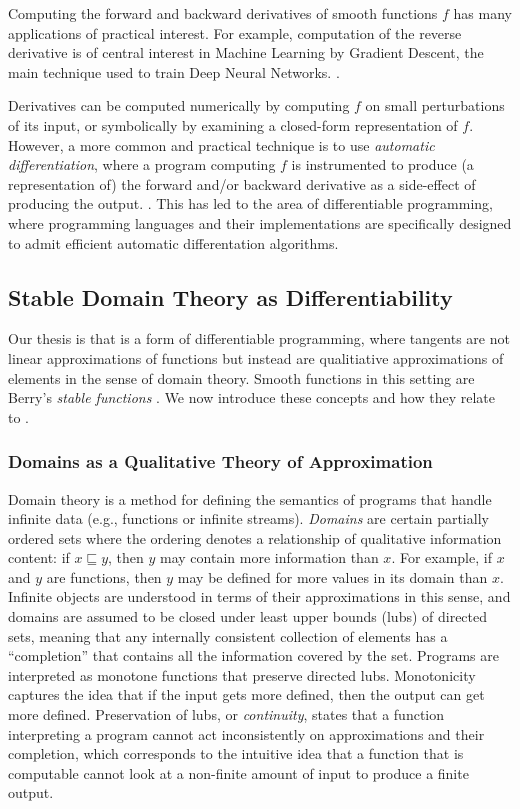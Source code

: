 Computing the forward and backward derivatives of smooth functions $f$ has many applications of practical interest. For example, computation of the reverse derivative is of central interest in Machine Learning by Gradient Descent, the main technique used to train Deep Neural Networks. .

Derivatives can be computed numerically by computing $f$ on small perturbations of its input, or symbolically by examining a closed-form representation of $f$. However, a more common and practical technique is to use \emph{automatic differentiation}, where a program computing $f$ is instrumented to produce (a representation of) the forward and/or backward derivative as a side-effect of producing the output. . This has led to the area of differentiable programming, where programming languages and their implementations are specifically designed to admit efficient automatic differentation algorithms. 

\subsection{Stable Domain Theory as Differentiability}

Our thesis is that \GPS is a form of differentiable programming, where tangents are not linear approximations of functions but instead are qualitiative approximations of elements in the sense of domain theory. Smooth functions in this setting are Berry's \emph{stable functions} \cite{berry79,berry82}. We now introduce these concepts and how they relate to \GPS.

\subsubsection{Domains as a Qualitative Theory of Approximation}

Domain theory is a method for defining the semantics of programs that handle infinite data (e.g., functions or infinite streams). \emph{Domains} are certain partially ordered sets where the ordering denotes a relationship of qualitative information content: if $x \sqsubseteq y$, then $y$ may contain more information than $x$. For example, if $x$ and $y$ are functions, then $y$ may be defined for more values in its domain than $x$. Infinite objects are understood in terms of their approximations in this sense, and domains are assumed to be closed under least upper bounds (lubs) of directed sets, meaning that any internally consistent collection of elements has a ``completion'' that contains all the information covered by the set. Programs are interpreted as monotone functions that preserve directed lubs. Monotonicity captures the idea that if the input gets more defined, then the output can get more defined. Preservation of lubs, or \emph{continuity}, states that a function interpreting a program cannot act inconsistently on approximations and their completion, which corresponds to the intuitive idea that a function that is computable cannot look at a non-finite amount of input to produce a finite output.

